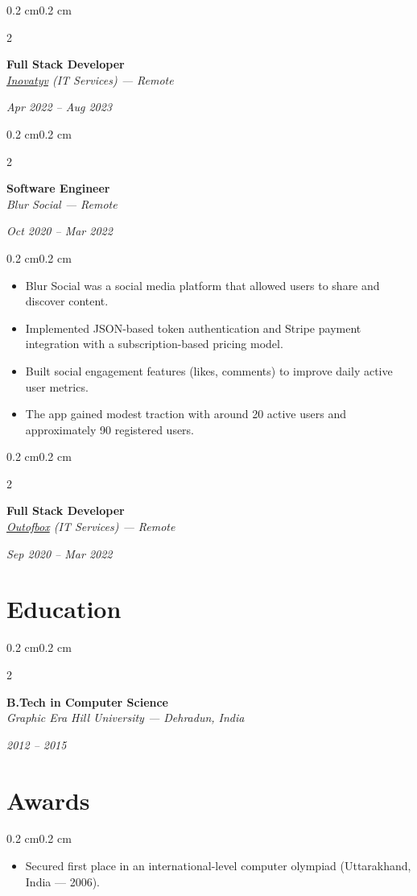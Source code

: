 \documentclass[10pt, letterpaper]{article}
\newenvironment{highlights}{
    \begin{itemize}[
        topsep=0.10 cm,
        parsep=0.10 cm,
        partopsep=0pt,
        itemsep=0pt,
        leftmargin=0.5 cm
    ]
}{
    \end{itemize}
}
\newenvironment{onecolentry}{
    \begin{adjustwidth}{0.2 cm}{0.2 cm}
}{
    \end{adjustwidth}
}
\newenvironment{twocolentry}[2][]{
    \onecolentry
    \def\secondColumn{#2}
    \setcolumnwidth{\fill, 4.5 cm}
    \begin{paracol}{2}
}{
    \switchcolumn \raggedleft \secondColumn
    \end{paracol}
    \endonecolentry
}
\begin{document}
\vspace{0.2cm}

\begin{twocolentry}{\textit{Apr 2022 -- Aug 2023}}
    \textbf{Full Stack Developer} \\
    \textit{\href{https://www.inovatyv.com}{Inovatyv} (IT Services) — Remote}
\end{twocolentry}


\vspace{0.2cm}

\begin{twocolentry}{\textit{Oct 2020 -- Mar 2022}}
    \textbf{Software Engineer} \\
    \textit{Blur Social — Remote}
\end{twocolentry}
\begin{onecolentry}
\begin{highlights}
    \item Blur Social was a social media platform that allowed users to share and discover content.
    \item Implemented JSON-based token authentication and Stripe payment integration with a subscription-based pricing model.
    \item Built social engagement features (likes, comments) to improve daily active user metrics.
    \item The app gained modest traction with around 20 active users and approximately 90 registered users.
\end{highlights}
\end{onecolentry}

\vspace{0.2cm}

\begin{twocolentry}{\textit{Sep 2020 -- Mar 2022}}
    \textbf{Full Stack Developer} \\
    \textit{\href{https://outofbox.co}{Outofbox} (IT Services) — Remote}
\end{twocolentry}

\section{Education}
\begin{twocolentry}{\textit{2012 -- 2015}}
    \textbf{B.Tech in Computer Science} \\
    \textit{Graphic Era Hill University — Dehradun, India}
\end{twocolentry}

\section{Awards}
\begin{onecolentry}
\begin{highlights}
    \item Secured first place in an international-level computer olympiad (Uttarakhand, India — 2006).
\end{highlights}
\end{onecolentry}
\end{document}
